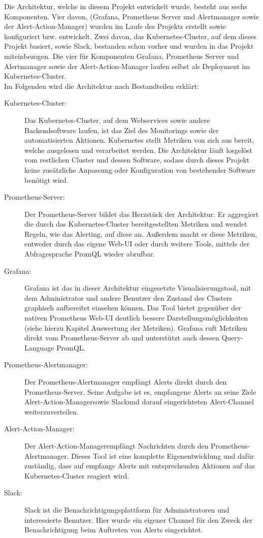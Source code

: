 \documentclass[a4paper,10pt]{scrartcl}
\begin{document}
Die Architektur, welche in diesem Projekt entwickelt wurde, besteht aus sechs Komponenten. Vier davon, (Grafana, Prometheus Server und Alertmanager sowie der Alert-Action-Manager) wurden im Laufe des Projekts erstellt sowie konfiguriert bzw. entwickelt. Zwei davon, das Kubernetes-Cluster, auf dem dieses Projekt basiert, sowie Slack, bestanden schon vorher und wurden in das Projekt miteinbezogen. Die vier für Komponenten Grafana, Prometheus Server und Alertmanager sowie der Alert-Action-Manager laufen selbst als Deployment im Kubernetes-Cluster.\\
Im Folgenden wird die Architektur nach Bestandteilen erklärt:\\
\begin{description}
\item[Kubernetes-Cluster:]
Das Kubernetes-Cluster, auf dem Webservices sowie andere Backendsoftware laufen, ist das Ziel des Monitorings sowie der automatisierten Aktionen. Kubernetes stellt Metriken von sich aus bereit, welche ausgelesen und verarbeitet werden. Die Architektur läuft losgelöst vom restlichen Cluster und dessen Software, sodass durch dieses Projekt keine zusätzliche Anpassung oder Konfiguration von bestehender Software benötigt wird.
\item[Prometheus-Server:]
Der Prometheus-Server bildet das Herzstück der Architektur. Er aggregiert die durch das Kubernetes-Cluster bereitgestellten Metriken und wendet Regeln, wie das Alerting, auf diese an. Außerdem macht er diese Metriken, entweder durch das eigene Web-UI oder durch weitere Tools, mittels der Abfragesprache PromQL wieder abrufbar.
\item[Grafana:]
Grafana ist das in dieser Architektur eingesetzte Visualisierungstool, mit dem Administrator und andere Benutzer den Zustand des Clusters graphisch aufbereitet einsehen können. Das Tool bietet gegenüber der nativen Prometheus Web-UI deutlich bessere Darstellungsmöglichkeiten (siehe hierzu Kapitel Auswertung der Metriken). Grafana ruft Metriken direkt vom Prometheus-Server ab und unterstützt auch dessen Query-Language PromQL.
\item[Prometheus-Alertmanager:]
Der Prometheus-Alertmanager empfängt Alerts direkt durch den Prometheus-Server. Seine Aufgabe ist es, empfangene Alerts an seine Ziele \glqq Alert-Action-Manager\grqq sowie \glqq Slack\grqq und darauf eingerichteten Alert-Channel weiterzuverteilen.
\item[Alert-Action-Manager:]
Der \glqq Alert-Action-Manager\grqq empfängt Nachrichten durch den Prometheus-Alertmanager. Dieses Tool ist eine komplette Eigenentwicklung und dafür zuständig, dass auf empfange Alerts mit entsprechenden Aktionen auf das Kubernetes-Cluster reagiert wird.
\item[Slack:]
Slack ist die Benachrichtigungsplattform für Administratoren und interessierte Benutzer. Hier wurde ein eigener Channel für den Zweck der Benachrichtigung beim Auftreten von Alerts eingerichtet.

\end{description}
\end{document}
